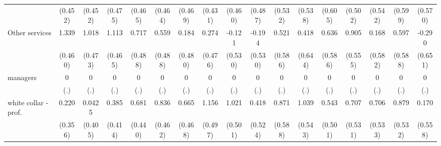{\begin{tabular}{l*{16}{c}}
                    &     (0.452)         &     (0.452)         &     (0.475)         &     (0.465)         &     (0.464)         &     (0.469)         &     (0.431)         &     (0.460)         &     (0.487)         &     (0.532)         &     (0.538)         &     (0.605)         &     (0.502)         &     (0.542)         &     (0.599)         &     (0.570)         \\
[1em]
Other services      &       1.339\sym{**} &       1.018\sym{*}  &       1.113\sym{*}  &       0.717         &       0.559         &       0.184         &       0.274         &      -0.121         &      -0.194         &       0.521         &       0.418         &       0.636         &       0.905         &       0.168         &       0.597         &      -0.290         \\
                    &     (0.460)         &     (0.473)         &     (0.465)         &     (0.488)         &     (0.488)         &     (0.480)         &     (0.476)         &     (0.530)         &     (0.530)         &     (0.586)         &     (0.644)         &     (0.586)         &     (0.555)         &     (0.582)         &     (0.588)         &     (0.651)         \\
[1em]
managers            &           0         &           0         &           0         &           0         &           0         &           0         &           0         &           0         &           0         &           0         &           0         &           0         &           0         &           0         &           0         &           0         \\
                    &         (.)         &         (.)         &         (.)         &         (.)         &         (.)         &         (.)         &         (.)         &         (.)         &         (.)         &         (.)         &         (.)         &         (.)         &         (.)         &         (.)         &         (.)         &         (.)         \\
[1em]
white collar - prof.&       0.220         &      0.0425         &       0.385         &       0.681         &       0.836         &       0.665         &       1.156\sym{*}  &       1.021\sym{*}  &       0.418         &       0.871         &       1.039         &       0.543         &       0.707         &       0.706         &       0.879         &       0.170         \\
                    &     (0.356)         &     (0.405)         &     (0.414)         &     (0.440)         &     (0.462)         &     (0.468)         &     (0.497)         &     (0.501)         &     (0.524)         &     (0.588)         &     (0.543)         &     (0.501)         &     (0.531)         &     (0.533)         &     (0.532)         &     (0.558)         \\

\end{tabular}}
